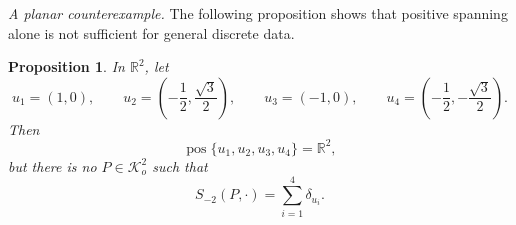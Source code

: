 \documentclass[12pt,reqno]{amsart}
\numberwithin{equation}{section}
\newtheorem{proposition}[theorem]{Proposition}
\theoremstyle{remark}
\DeclareMathOperator{\pos}{pos}
\newcommand{\R}{\mathbb R}
\begin{document}
\medskip
\noindent\emph{A planar counterexample.}
The following proposition shows that positive spanning alone is not
sufficient for general discrete data.

\begin{proposition}\label{prop:planar-counterexample}
	In \(\R^2\), let
	\begin{equation}\label{eq:counterexample-directions}
		u_1=(1,0),\qquad
		u_2=\left(-\frac12,\frac{\sqrt3}{2}\right),\qquad
		u_3=(-1,0),\qquad
		u_4=\left(-\frac12,-\frac{\sqrt3}{2}\right).
	\end{equation}
	Then
	\[
	\pos\{u_1,u_2,u_3,u_4\}=\R^2,
	\]
	but there is no \(P\in\mathcal K_o^2\) such that
	\begin{equation}\label{eq:counterexample-target}
		S_{-2}(P,\cdot)
		=
		\sum_{i=1}^4\delta_{u_i}.
	\end{equation}
\end{proposition}
\end{document}

